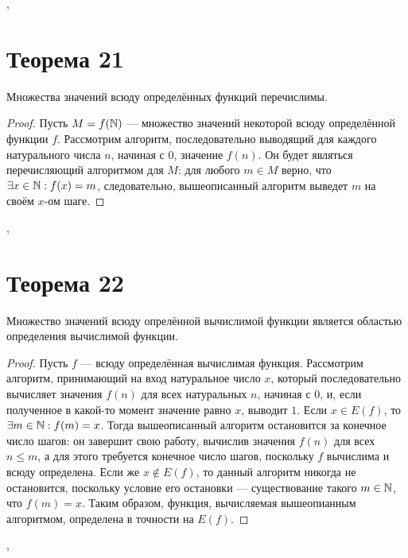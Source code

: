 \documentclass[a4paper,12pt]{article}
\begin{document}
    \sep
    
    \section {Теорема 21}
    \begin{theorem}
    Множества значений всюду определённых функций перечислимы.
    \end{theorem}
    \begin{proof} 
    Пусть $M=f(\mathbb{N})$ --- множество значений некоторой всюду определённой функции $f$. Рассмотрим алгоритм, последовательно выводящий для каждого натурального числа $n$, начиная с $0$, значение $f(n)$. Он будет являться перечисляющий алгоритмом для $M$: для любого $m\in M$ верно, что $\exists x \in \mathbb{N} : f(x) = m$, следовательно, вышеописанный алгоритм выведет $m$ на своём $x$-ом шаге.
    \end{proof}
	
	\sep
    
    \section {Теорема 22}
    \begin{theorem}
    Множество значений всюду опрелённой вычислимой функции является областью определения вычислимой функции.
    \end{theorem} 
    \begin{proof} Пусть $f$ --- всюду определённая вычислимая функция. Рассмотрим алгоритм, принимающий на вход натуральное число $x$, который последовательно вычисляет значения $f(n)$ для всех натуральных $n$, начиная с $0$, и, если полученное в какой-то момент значение равно $x$, выводит $1$. Если $x\in E(f)$, то $\exists m \in \mathbb{N} : f(m) = x$. Тогда вышеописанный алгоритм остановится за конечное число шагов: он завершит свою работу, вычислив значения $f(n)$ для всех $n\leqslant m$, а для этого требуется конечное число шагов, поскольку $f$ вычислима и всюду определена. Если же $x\not\in E(f)$, то данный алгоритм никогда не остановится, поскольку условие его остановки --- существование такого $m\in\mathbb{N}$, что $f(m)=x$. Таким образом, функция, вычисляемая вышеопианным алгоритмом, определена в точности на $E(f)$.
    \end{proof}
	
	\sep
	
\end{document}

